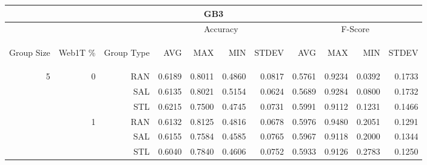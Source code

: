 \begin{center}
\begin{table}[htbp]
\begin{tabular}{ | r | r | r | r | r | r | r | r | r | r | r |}
\hline
\multicolumn{11}{|c|}{GB3}\\
\hline
 & & & \multicolumn{4}{|c|}{Accuracy} & \multicolumn{4}{|c|}{F-Score}\\ \cline{4-11}
\begin{sideways}Group Size\end{sideways} & \begin{sideways}Web1T \%\end{sideways} & \begin{sideways}Group Type\end{sideways} & \begin{sideways}AVG\end{sideways} & \begin{sideways}MAX\end{sideways} & \begin{sideways}MIN\end{sideways} & \begin{sideways}STDEV\end{sideways} & \begin{sideways}AVG\end{sideways} & \begin{sideways}MAX\end{sideways} & \begin{sideways}MIN\end{sideways} & \begin{sideways}STDEV\end{sideways}\\
\hline
\multirow{18}{*}{5}
 & \multirow{3}{*}{0} & RAN & 0.6189 & 0.8011 & 0.4860 & 0.0817 & 0.5761 & 0.9234 & 0.0392 & 0.1733\\ \cline{3-11}
 &   & SAL & 0.6135 & 0.8021 & 0.5154 & 0.0624 & 0.5689 & 0.9284 & 0.0800 & 0.1732\\ \cline{3-11}
 &   & STL & 0.6215 & 0.7500 & 0.4745 & 0.0731 & 0.5991 & 0.9112 & 0.1231 & 0.1466\\ \cline{2-11}
 & \multirow{3}{*}{1} & RAN & 0.6132 & 0.8125 & 0.4816 & 0.0678 & 0.5976 & 0.9480 & 0.2051 & 0.1291\\ \cline{3-11}
 &   & SAL & 0.6155 & 0.7584 & 0.4585 & 0.0765 & 0.5967 & 0.9118 & 0.2000 & 0.1344\\ \cline{3-11}
 &   & STL & 0.6040 & 0.7840 & 0.4606 & 0.0752 & 0.5933 & 0.9126 & 0.2783 & 0.1250\\ \cline{2-11}

\end{tabular}
\end{table}
\end{center}
